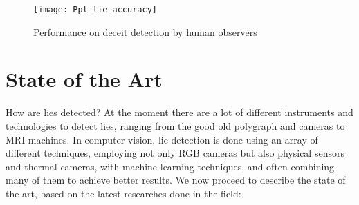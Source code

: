 \begin{figure}[H]
	\centering
	\texttt{[image: Ppl\_lie\_accuracy]}
	\caption{Performance on deceit detection by human observers \cite{SU201652}}
\end{figure}
 
\pagebreak

\section{State of the Art} \label{sota}
How are lies detected? At the moment there are a lot of different instruments and technologies to detect lies, ranging from the good old polygraph and cameras to MRI machines. 
In computer vision, lie detection is done using an array of different techniques, employing not only RGB cameras but also physical sensors and thermal cameras, with machine learning techniques, and often combining many of them to achieve better results. 
We now proceed to describe the state of the art, based on the latest researches done in the field:

